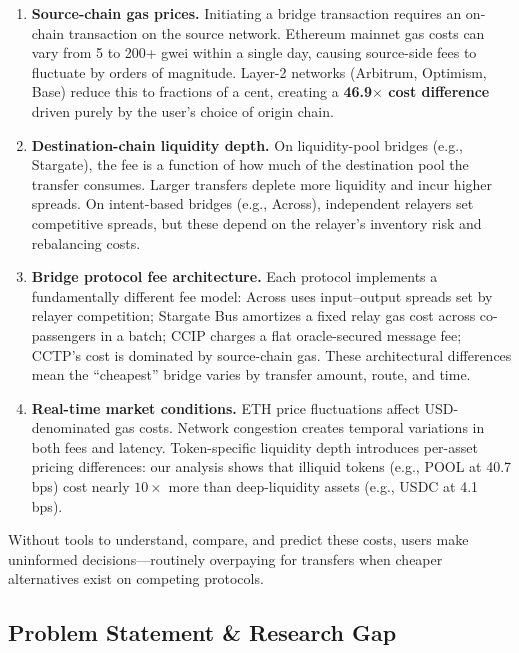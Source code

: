 \begin{enumerate}
    \item \textbf{Source-chain gas prices.} Initiating a bridge transaction requires an on-chain transaction on the source network. Ethereum mainnet gas costs can vary from 5 to 200+ gwei within a single day, causing source-side fees to fluctuate by orders of magnitude. Layer-2 networks (Arbitrum, Optimism, Base) reduce this to fractions of a cent, creating a \textbf{46.9$\times$ cost difference} driven purely by the user's choice of origin chain.

    \item \textbf{Destination-chain liquidity depth.} On liquidity-pool bridges (e.g., Stargate), the fee is a function of how much of the destination pool the transfer consumes. Larger transfers deplete more liquidity and incur higher spreads. On intent-based bridges (e.g., Across), independent relayers set competitive spreads, but these depend on the relayer's inventory risk and rebalancing costs.

    \item \textbf{Bridge protocol fee architecture.} Each protocol implements a fundamentally different fee model: Across uses input--output spreads set by relayer competition; Stargate Bus amortizes a fixed relay gas cost across co-passengers in a batch; CCIP charges a flat oracle-secured message fee; CCTP's cost is dominated by source-chain gas. These architectural differences mean the ``cheapest'' bridge varies by transfer amount, route, and time.

    \item \textbf{Real-time market conditions.} ETH price fluctuations affect USD-denominated gas costs. Network congestion creates temporal variations in both fees and latency. Token-specific liquidity depth introduces per-asset pricing differences: our analysis shows that illiquid tokens (e.g., POOL at 40.7 bps) cost nearly $10\times$ more than deep-liquidity assets (e.g., USDC at 4.1 bps).
\end{enumerate}

Without tools to understand, compare, and predict these costs, users make uninformed decisions---routinely overpaying for transfers when cheaper alternatives exist on competing protocols.

\subsection{Problem Statement \& Research Gap}\label{sec: problem}

